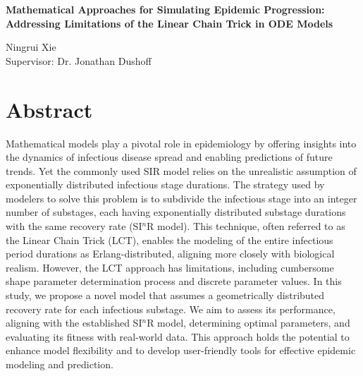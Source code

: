 \documentclass[12pt]{article}
\begin{document}
\begin{spacing}{1.0}
\begin{center}
    \Large
    \textbf{Mathematical Approaches for Simulating Epidemic Progression: Addressing Limitations of the Linear Chain Trick in ODE Models}
    
    \large
    \vspace{0.4cm}
    Ningrui Xie \\ Supervisor: Dr. Jonathan Dushoff
\end{center}
\end{spacing}


\section*{Abstract}
Mathematical models play a pivotal role in epidemiology by offering insights into the dynamics of infectious disease spread and enabling predictions of future trends. Yet the commonly used SIR model relies on the unrealistic assumption of exponentially distributed infectious stage durations. The strategy used by modelers to solve this problem is to subdivide the infectious stage into an integer number of substages, each having exponentially distributed substage durations with the same recovery rate (SI$^n$R model). This technique, often referred to as the Linear Chain Trick (LCT), enables the modeling of the entire infectious period durations as Erlang-distributed, aligning more closely with biological realism. However, the LCT approach has limitations, including cumbersome shape parameter determination process and discrete parameter values. In this study, we propose a novel model that assumes a geometrically distributed recovery rate for each infectious substage. We aim to assess its performance, aligning with the established SI$^n$R model, determining optimal parameters, and evaluating its fitness with real-world data. This approach holds the potential to enhance model flexibility and to develop user-friendly tools for effective epidemic modeling and prediction.
\pagebreak
\end{document}

